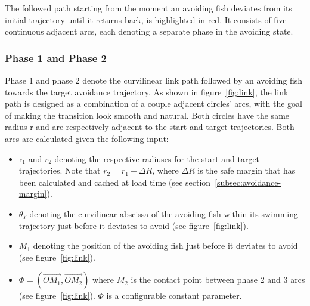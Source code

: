 The followed path starting from the moment an avoiding fish deviates from its initial trajectory until it returns back, is highlighted in red. It consists of five continuous adjacent arcs, each denoting a separate phase in the avoiding state.

\subsubsection{Phase 1 and Phase 2}

Phase 1 and phase 2 denote the curvilinear link path followed by an avoiding fish towards the target avoidance trajectory. As shown in figure~\ref{fig:link}, the link path is designed as a combination of a couple adjacent circles' arcs, with the goal of making the transition look smooth and natural. Both circles have the same radius r and are respectively adjacent to the start and target trajectories. Both arcs are calculated given the following input:
\begin{itemize}
\item r$_1$ and $r_2$ denoting the respective radiuses for the start and target trajectories. Note that $r_2 = r_1 - \Delta R$, where $\Delta R$ is the safe margin that has been calculated and cached at load time (see section~\ref{subsec:avoidance-margin}).
\item $\theta_Y$ denoting the curvilinear abscissa of the avoiding fish within its swimming trajectory just before it deviates to avoid (see figure~\ref{fig:link}).
\item $M_1$ denoting the position of the avoiding fish just before it deviates to avoid (see figure~\ref{fig:link}).
\item $\Phi = (\overrightarrow{OM_1}, \overrightarrow{OM_2})$ where $M_2$ is the contact point between phase 2 and 3 arcs (see figure~\ref{fig:link}). $\Phi$ is a configurable constant parameter.
\end{itemize}

